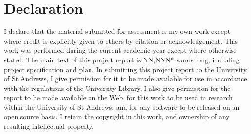 \section*{Declaration}
I declare that the material submitted for assessment is my own work except where credit is explicitly given to others by citation or acknowledgement. This work was performed during the current academic year except where otherwise stated.
\n
The main text of this project report is NN,NNN* words long, including project specification and plan.
\n
In submitting this project report to the University of St Andrews, I give permission for it to be made available for use in accordance with the regulations of the University Library. I also give permission for the report to be made available on the Web, for this work to be used in research within the University of St Andrews, and for any software to be released on an open source basis. I retain the copyright in this work, and ownership of any resulting intellectual property.
